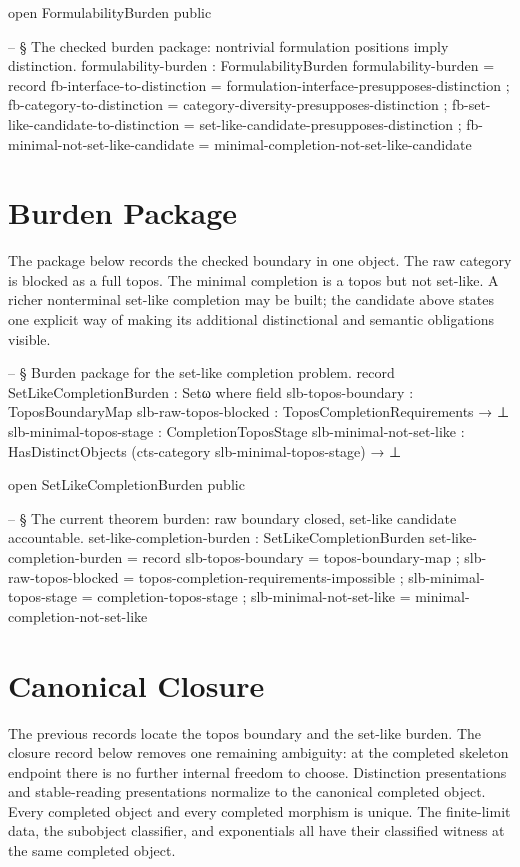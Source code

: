 \documentclass[11pt]{article}
\begin{document}
\begin{code}
open FormulabilityBurden public

-- § The checked burden package: nontrivial formulation positions imply distinction.
formulability-burden : FormulabilityBurden
formulability-burden = record
  { fb-interface-to-distinction = formulation-interface-presupposes-distinction
  ; fb-category-to-distinction = category-diversity-presupposes-distinction
  ; fb-set-like-candidate-to-distinction = set-like-candidate-presupposes-distinction
  ; fb-minimal-not-set-like-candidate = minimal-completion-not-set-like-candidate
  }
\end{code}

\section{Burden Package}

The package below records the checked boundary in one object.  The raw
category is blocked as a full topos.  The minimal completion is a topos
but not set-like.  A richer nonterminal set-like completion may be built;
the candidate above states one explicit way of making its additional
distinctional and semantic obligations visible.

\begin{code}
-- § Burden package for the set-like completion problem.
record SetLikeCompletionBurden : Setω where
  field
    slb-topos-boundary        : ToposBoundaryMap
    slb-raw-topos-blocked     : ToposCompletionRequirements → ⊥
    slb-minimal-topos-stage   : CompletionToposStage
    slb-minimal-not-set-like  :
      HasDistinctObjects (cts-category slb-minimal-topos-stage) → ⊥

open SetLikeCompletionBurden public

-- § The current theorem burden: raw boundary closed, set-like candidate accountable.
set-like-completion-burden : SetLikeCompletionBurden
set-like-completion-burden = record
  { slb-topos-boundary       = topos-boundary-map
  ; slb-raw-topos-blocked    = topos-completion-requirements-impossible
  ; slb-minimal-topos-stage  = completion-topos-stage
  ; slb-minimal-not-set-like = minimal-completion-not-set-like
  }
\end{code}

\section{Canonical Closure}

The previous records locate the topos boundary and the set-like burden.
The closure record below removes one remaining ambiguity: at the
completed skeleton endpoint there is no further internal freedom to
choose.  Distinction presentations and stable-reading presentations
normalize to the canonical completed object.  Every completed object and
every completed morphism is unique.  The finite-limit data, the
subobject classifier, and exponentials all have their classified witness
at the same completed object.
\end{document}
